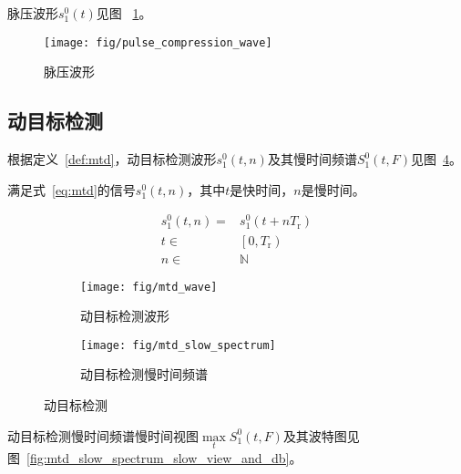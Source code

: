 \documentclass[../main]{subfiles}
\begin{document}
脉压波形$s_1^0(t)$见图%
~\ref{fig:pulse_compression_wave}。

\begin{figure}[htbp]
  \centering
  \texttt{[image: fig/pulse\_compression\_wave]}
  \caption{脉压波形}%
  \label{fig:pulse_compression_wave}
\end{figure}

\subsection{动目标检测}%
\label{sub:mtd}

根据定义~\ref{def:mtd}，动目标检测波形$s_1^0(t, n)$及其慢时间频谱$S_1^0(t, F)$见图~\ref{fig:mtd}。

\begin{definition}[动目标检测信号]%
  \label{def:mtd}
  满足式~\ref{eq:mtd}的信号$s_1^0(t, n)$，其中$t$是快时间，$n$是慢时间。
\end{definition}

\begin{align}
  \label{eq:mtd}
  s_1^0(t, n) = & s_1^0(t + nT_\mathrm{r})\\
  t \in & \left[0, T_\mathrm{r}\right)\\
  n \in & \mathbb{N}
\end{align}

\begin{figure}[htbp]
  \centering
  \begin{subfigure}[htbp]{0.45\linewidth}
    \centering
    \texttt{[image: fig/mtd\_wave]}
    \caption{动目标检测波形}%
    \label{fig:mtd_wave}
  \end{subfigure}
  \quad
  \begin{subfigure}[htbp]{0.45\linewidth}
    \centering
    \texttt{[image: fig/mtd\_slow\_spectrum]}
    \caption{动目标检测慢时间频谱}%
    \label{fig:mtd_slow_spectrum}
  \end{subfigure}
  \caption{动目标检测}%
  \label{fig:mtd}
\end{figure}

动目标检测慢时间频谱慢时间视图$\max\limits_{t}S_1^0(t, F)$及其波特图见
图~\ref{fig:mtd_slow_spectrum_slow_view_and_db}。
\end{document}
